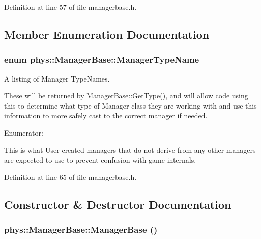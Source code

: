 Definition at line 57 of file managerbase.h.



\subsection{Member Enumeration Documentation}
\hypertarget{classphys_1_1ManagerBase_aaa6ccddf23892eaccb898529414f80a5}{
\subsubsection[{ManagerTypeName}]{\setlength{\rightskip}{0pt plus 5cm}enum {\bf phys::ManagerBase::ManagerTypeName}}}
\label{d2/de3/classphys_1_1ManagerBase_aaa6ccddf23892eaccb898529414f80a5}


A listing of Manager TypeNames. 

These will be returned by \hyperlink{classphys_1_1ManagerBase_aff400b6599db635e24796d8221e9a0e3}{ManagerBase::GetType()}, and will allow code using this to determine what type of Manager class they are working with and use this information to more safely cast to the correct manager if needed. \begin{Desc}
\item[Enumerator: ]\par
\begin{description}
\item[{\em 
\hypertarget{classphys_1_1ManagerBase_aaa6ccddf23892eaccb898529414f80a5a3239296e554feede76c4bcb6f824c66c}{
UserCreated}
\label{d2/de3/classphys_1_1ManagerBase_aaa6ccddf23892eaccb898529414f80a5a3239296e554feede76c4bcb6f824c66c}
}]This is what User created managers that do not derive from any other managers are expected to use to prevent confusion with game internals. \end{description}
\end{Desc}



Definition at line 65 of file managerbase.h.



\subsection{Constructor \& Destructor Documentation}
\hypertarget{classphys_1_1ManagerBase_a80c0d01d0dc19511cd08fc6ac805a616}{
\subsubsection[{ManagerBase}]{\setlength{\rightskip}{0pt plus 5cm}phys::ManagerBase::ManagerBase ()}}
\label{d2/de3/classphys_1_1ManagerBase_a80c0d01d0dc19511cd08fc6ac805a616}



